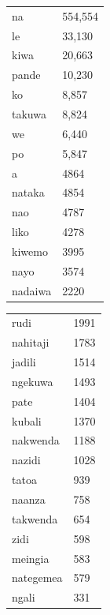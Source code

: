 \documentclass[output=paper,colorlinks,citecolor=brown]{langscibook}
\begin{document}
\begin{table}  


\begin{minipage}{.3\textwidth}
\begin{tabular}{ll} 
\lsptoprule 
na & 554,554 \\
le & 33,130 \\
ki{w}a & 20,663 \\
pande & 10,230 \\
ko & 8,857 \\
{ta}kuwa & 8,824 \\
we &6,440 \\
po & 5,847 \\
a & 4864 \\
na{tak}a & 4854 \\
nao & 4787 \\
{li}ko & 4278 \\
kiwemo & 3995 \\
nayo & 3574 \\
{na}{daiw}a & 2220 \\

\end{tabular}
\end{minipage}
\begin{minipage}{.3\textwidth}
\begin{tabular}{ll}
{rudi} & 1991 \\ 
{na}{hitaji} & 1783\\
{jadili} & 1514 \\
{nge}ku{w}a & 1493 \\
{pat}e & 1404 \\ 
{kubali} & 1370 \\ 
{na}kw{end}a &  1188 \\ 
{na}{zidi} & 1028 \\ 
{ta}{to}a & 939 \\ 
{na}{anz}a & 758 \\ 
{ta}kw{end}a  & 654  \\   
{zidi}& 598 \\ 
{me}ingia    & 583 \\ 
{na}{tegemea}    & 579 \\ 

ngali & 331 \\ 


\end{tabular}
\end{minipage}
\end{table}
\end{document}
